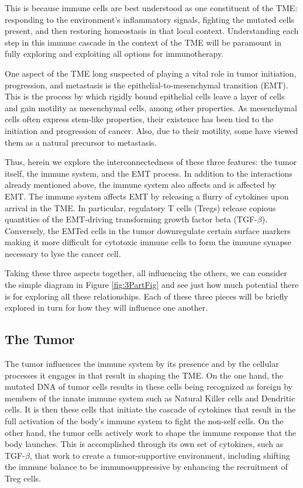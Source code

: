 \documentclass{article}
\begin{document}
This is because immune cells are best understood as one constituent of the TME: responding to the environment's inflammatory signals, fighting the mutated cells present, and then restoring homeostasis in that local context.
Understanding each step in this immune cascade in the context of the TME will be paramount in fully exploring and exploiting all options for immunotherapy.

One aspect of the TME long suspected of playing a vital role in tumor initiation, progression, and metastasis is the epithelial-to-mesenchymal transition (EMT). 
This is the process by which rigidly bound epithelial cells leave a layer of cells and gain motility as mesenchymal cells, among other properties.
As mesenchymal cells often express stem-like properties, their existence has been tied to the initiation and progression of cancer.
Also, due to their motility, some have viewed them as a natural precursor to metastasis.

Thus, herein we explore the interconnectedness of these three features: the tumor itself, the immune system, and the EMT process.
In addition to the interactions already mentioned above, the immune system also affects and is affected by EMT.
The immune system affects EMT by releasing a flurry of cytokines upon arrival in the TME.
In particular, regulatory T cells (Tregs) release copious quantities of the EMT-driving transforming growth factor beta (TGF-$\beta$).
Conversely, the EMTed cells in the tumor downregulate certain surface markers making it more difficult for cytotoxic immune cells to form the immune synapse necessary to lyse the cancer cell.

Taking these three aspects together, all influencing the others, we can consider the simple diagram in Figure \ref{fig:3PartFig} and see just how much potential there is for exploring all these relationships.
Each of these three pieces will be briefly explored in turn for how they will influence one another.

\subsection{The Tumor}\label{TheTumor}
The tumor influences the immune system by its presence and by the cellular processes it engages in that result in shaping the TME.
On the one hand, the mutated DNA of tumor cells results in these cells being recognized as foreign by members of the innate immune system such as Natural Killer cells and Dendritic cells.
It is then these cells that initiate the cascade of cytokines that result in the full activation of the body's immune system to fight the non-self cells.
On the other hand, the tumor cells actively work to shape the immune response that the body launches.
This is accomplished through its own set of cytokines, such as TGF-$\beta$, that work to create a tumor-supportive environment, including shifting the immune balance to be immunosuppressive by enhancing the recruitment of Treg cells.
\end{document}
